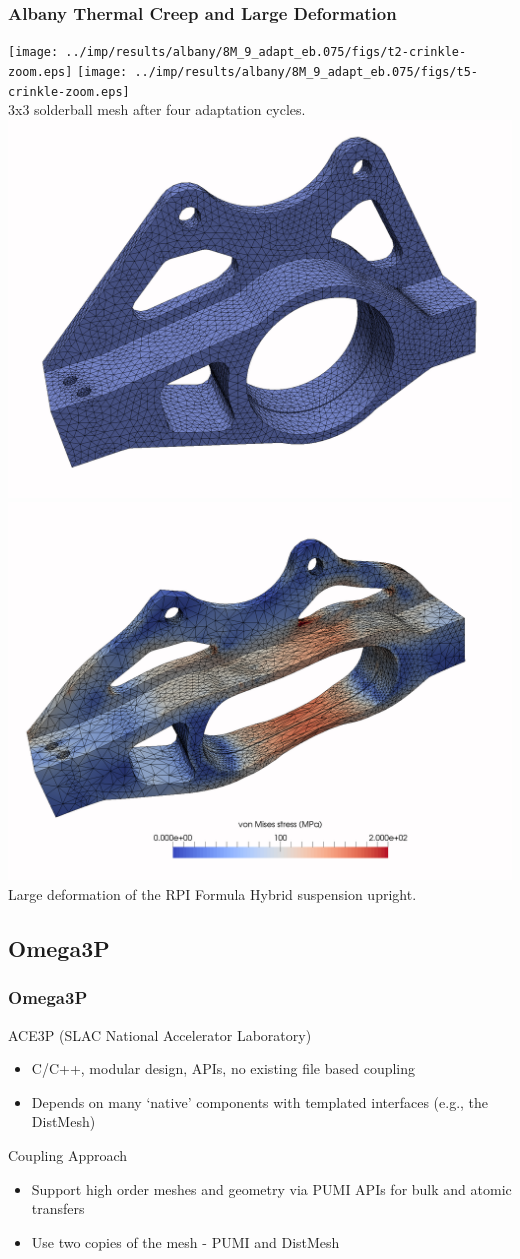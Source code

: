 \documentclass{beamer}
\begin{document}
\begin{frame}
  \frametitle{Albany Thermal Creep and Large Deformation}
  \centering
  \texttt{[image: ../imp/results/albany/8M\_9\_adapt\_eb.075/figs/t2-crinkle-zoom.eps]}
  \texttt{[image: ../imp/results/albany/8M\_9\_adapt\_eb.075/figs/t5-crinkle-zoom.eps]}\\
  \small
  3x3 solderball mesh after four adaptation cycles.\\
  \includegraphics[width=.45\textwidth]{../imp/figures/upright/upright-initial.png}
  \includegraphics[width=.45\textwidth]{../imp/figures/upright/upright-final.png}\\
  \small
  Large deformation of the RPI Formula Hybrid suspension upright.
\end{frame}

\subsection{Omega3P}

\begin{frame}
  \frametitle{Omega3P}
  ACE3P (SLAC National Accelerator Laboratory)
  \begin{itemize}
    \item C/C++, modular design, APIs, no existing file based coupling
    \item Depends on many `native' components with templated interfaces
      (e.g., the DistMesh)
  \end{itemize}
  Coupling Approach
  \begin{itemize}
    \item Support high order meshes and geometry via PUMI APIs for bulk and
      atomic transfers
    \item Use two copies of the mesh - PUMI and DistMesh
  \end{itemize}
\end{frame}
\end{document}
